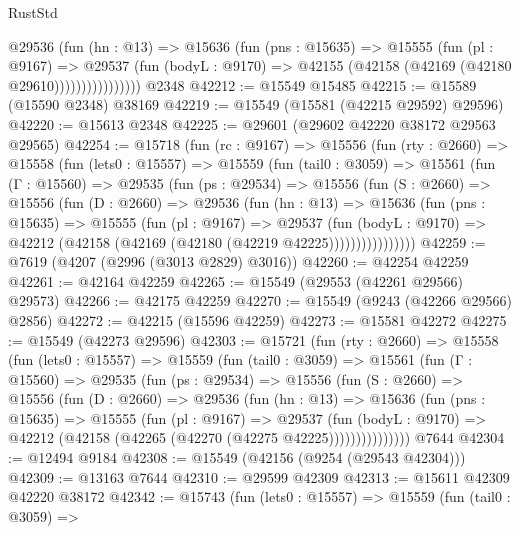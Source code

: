 \begin{lexlean}{RustStd}
\begin{coremodule}
                    @29536
                      (fun (hn : @13) =>
                      @15636
                        (fun (pns : @15635) =>
                        @15555
                          (fun (pl : @9167) =>
                          @29537
                            (fun (bodyL : @9170) =>
                            @42155 (@42158 (@42169 (@42180 @29610))))))))))))))))
    @2348
@42212 := @15549 @15485
@42215 := @15589 (@15590 @2348) @38169
@42219 := @15549 (@15581 (@42215 @29592) @29596)
@42220 := @15613 @2348
@42225 := @29601 (@29602 @42220 @38172 @29563 @29565)
@42254 := @15718
    (fun (rc : @9167) =>
    @15556
      (fun (rty : @2660) =>
      @15558
        (fun (lets0 : @15557) =>
        @15559
          (fun (tail0 : @3059) =>
          @15561
            (fun (Γ : @15560) =>
            @29535
              (fun (ps : @29534) =>
              @15556
                (fun (S : @2660) =>
                @15556
                  (fun (D : @2660) =>
                  @29536
                    (fun (hn : @13) =>
                    @15636
                      (fun (pns : @15635) =>
                      @15555
                        (fun (pl : @9167) =>
                        @29537
                          (fun (bodyL : @9170) =>
                          @42212 (@42158 (@42169 (@42180 (@42219 @42225))))))))))))))))
@42259 := @7619 (@4207 (@2996 (@3013 @2829) @3016))
@42260 := @42254 @42259
@42261 := @42164 @42259
@42265 := @15549 (@29553 (@42261 @29566) @29573)
@42266 := @42175 @42259
@42270 := @15549 (@9243 (@42266 @29566) @2856)
@42272 := @42215 (@15596 @42259)
@42273 := @15581 @42272
@42275 := @15549 (@42273 @29596)
@42303 := @15721
    (fun (rty : @2660) =>
    @15558
      (fun (lets0 : @15557) =>
      @15559
        (fun (tail0 : @3059) =>
        @15561
          (fun (Γ : @15560) =>
          @29535
            (fun (ps : @29534) =>
            @15556
              (fun (S : @2660) =>
              @15556
                (fun (D : @2660) =>
                @29536
                  (fun (hn : @13) =>
                  @15636
                    (fun (pns : @15635) =>
                    @15555
                      (fun (pl : @9167) =>
                      @29537
                        (fun (bodyL : @9170) =>
                        @42212 (@42158 (@42265 (@42270 (@42275 @42225)))))))))))))))
    @7644
@42304 := @12494 @9184
@42308 := @15549 (@42156 (@9254 (@29543 @42304)))
@42309 := @13163 @7644
@42310 := @29599 @42309
@42313 := @15611 @42309 @42220 @38172
@42342 := @15743
    (fun (lets0 : @15557) =>
    @15559
      (fun (tail0 : @3059) =>

\end{coremodule}
\end{lexlean}
